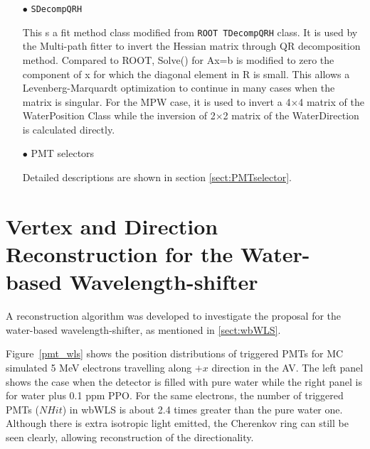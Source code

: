 \begin{itemize}
\item[$\bullet$] \texttt{SDecompQRH}

This s a fit method class modified from \texttt{ROOT TDecompQRH} class\cite{TDecompQRH}. It is used by the Multi-path fitter to invert the Hessian matrix through QR decomposition method\cite{press2007numerical}. Compared to ROOT, Solve() for Ax=b is modified to zero the component of x for which the diagonal element in R is small. This allows a Levenberg-Marquardt optimization to continue in many cases
when the matrix is singular. For the MPW case, it is used to invert a 4$\times$4 matrix of the WaterPosition Class while the inversion of 2$\times$2 matrix of the WaterDirection is calculated directly\cite{waterunidoc}.

\item[$\bullet$] PMT selectors

Detailed descriptions are shown in section \ref{sect:PMTselector}.

\end{itemize}

\section{Vertex and Direction Reconstruction for the Water-based Wavelength-shifter}
A reconstruction algorithm was developed to investigate the proposal for the water-based wavelength-shifter, as mentioned in \ref{sect:wbWLS}.

Figure~\ref{pmt_wls} shows the position distributions of triggered PMTs for MC simulated 5 MeV electrons travelling along $+x$ direction in the AV. The left panel shows the case when the detector is filled with pure water while the right panel is for water plus 0.1 ppm PPO. For the same electrons, the number of triggered PMTs ($NHit$) in wbWLS is about 2.4 times greater than the pure water one. Although there is extra isotropic light emitted, the Cherenkov ring can still be seen clearly, allowing reconstruction of the directionality.  


